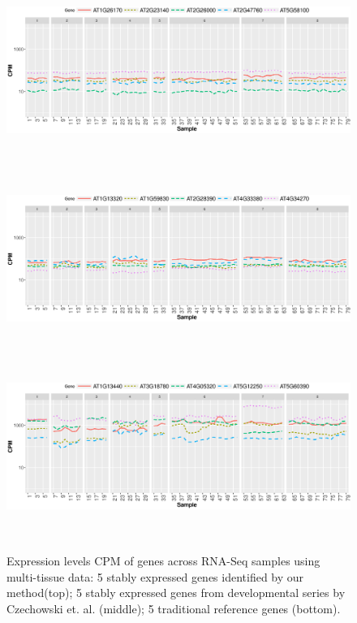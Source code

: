 \documentclass[11pt, a4paper]{article}
\begin{document}

 \begin{figure}[H]
\begin{center}
	\includegraphics[width=15cm,height=6cm]{Figures/A3.eps}
	\includegraphics[width=15cm,height=6cm]{Figures/A2.eps}
	\includegraphics[width=15cm,height=6cm]{Figures/A1.eps}
	\caption{{\small{\label{expressinlevel1} Expression levels CPM of genes across RNA-Seq samples using multi-tissue data: 5 stably expressed genes identified by our method(top)}; 5 stably expressed genes from developmental series by Czechowski et. al. (middle); 5 traditional reference genes (bottom).}}
\end{center}
\end{figure} 
\end{document}
